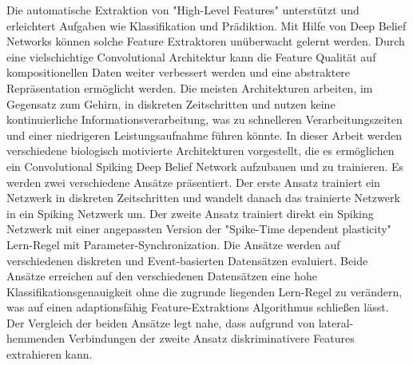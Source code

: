 Die automatische Extraktion von "High-Level Features" unterstützt und erleichtert Aufgaben wie Klassifikation und Prädiktion.
Mit Hilfe von Deep Belief Networks können solche Feature Extraktoren unüberwacht gelernt werden.
Durch eine vielschichtige Convolutional Architektur kann die Feature Qualität auf kompositionellen Daten weiter verbessert werden und eine abstraktere Repräsentation ermöglicht werden.
Die meisten Architekturen arbeiten, im Gegensatz zum Gehirn, in diskreten Zeitschritten und nutzen keine kontinuierliche Informationsverarbeitung, was zu schnelleren Verarbeitungszeiten und einer niedrigeren Leistungsaufnahme führen könnte.
In dieser Arbeit werden verschiedene biologisch motivierte Architekturen vorgestellt, die es ermöglichen ein Convolutional Spiking Deep Belief Network aufzubauen und zu trainieren.
Es werden zwei verschiedene Ansätze präsentiert.
Der erste Ansatz trainiert ein Netzwerk in diskreten Zeitschritten und wandelt danach das trainierte Netzwerk in ein Spiking Netzwerk um.
Der zweite Ansatz trainiert direkt ein Spiking Netzwerk mit einer angepassten Version der "Spike-Time dependent plasticity" Lern-Regel mit Parameter-Synchronization.
Die Ansätze werden auf verschiedenen diskreten und Event-basierten Datensätzen evaluiert.
Beide Ansätze erreichen auf den verschiedenen Datensätzen eine hohe Klassifikationsgenauigkeit ohne die zugrunde liegenden Lern-Regel zu verändern, was auf einen adaptionsfähig Feature-Extraktions Algorithmus schließen lässt.
Der Vergleich der beiden Ansätze legt nahe, dass aufgrund von lateral-hemmenden Verbindungen der zweite Ansatz diskriminativere Features extrahieren kann. 

        